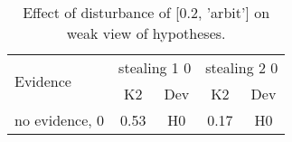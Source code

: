 \begin{table}\begin{tabular}{l|cc|cc}\toprule\multirow{2}{*}{Evidence} & \multicolumn{2}{c}{stealing 1 0}& \multicolumn{2}{c}{stealing 2 0}\\& {K2} & {Dev}& {K2} & {Dev}\\\midrule
no evidence, 0 & \cellcolor{Bittersweet}0.53&\cellcolor{Bittersweet}H0&\cellcolor{Bittersweet}0.17&\cellcolor{Bittersweet}H0\\\bottomrule\end{tabular}\caption{Effect of disturbance of [0.2, 'arbit'] on weak view of hypotheses.}\end{table}